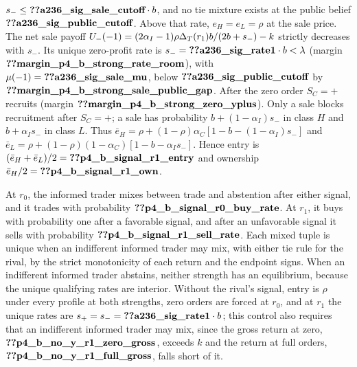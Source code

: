 \begin{itemize}[leftmargin=2em]
\(s_-\le\reg{a236_sig_sale_cutoff}\cdot b\), and no tie mixture exists at the public belief \(\reg{a236_sig_public_cutoff}\).
Above that rate, \(e_H=e_L=\rho\) at the sale price.
The net sale payoff \(U_-(-1)=(2\alpha_I-1)\rho\Delta_T(r_1)b/(2b+s_-)-k\) strictly decreases with \(s_-\).
Its unique zero-profit rate is \(s_-=\reg{a236_sig_rate1}\cdot b<\lambda\) (margin
\(\reg{margin_p4_b_strong_rate_room}\)), with \(\mu(-1)=\reg{a236_sig_sale_mu}\), below \(\reg{a236_sig_public_cutoff}\) by \(\reg{margin_p4_b_strong_sale_public_gap}\).
After the zero order \(S_C=+\) recruits (margin \(\reg{margin_p4_b_strong_zero_yplus}\)). Only a sale blocks recruitment
after \(S_C=+\); a sale has probability \(b+(1-\alpha_I)s_-\) in class \(H\) and \(b+\alpha_I s_-\) in class \(L\). Thus \(\bar e_H=\rho+(1-\rho)\alpha_C[1-b-(1-\alpha_I)s_-]\) and
\(\bar e_L=\rho+(1-\rho)(1-\alpha_C)[1-b-\alpha_I s_-]\). Hence entry is
\((\bar e_H+\bar e_L)/2=\reg{p4_b_signal_r1_entry}\) and ownership \(\bar e_H/2=\reg{p4_b_signal_r1_own}\).
\end{itemize}
At \(r_0\), the informed trader mixes between trade and abstention after either signal, and it trades with probability
\(\reg{p4_b_signal_r0_buy_rate}\). At \(r_1\), it buys with probability one after a favorable signal, and after an
unfavorable signal it sells with probability \(\reg{p4_b_signal_r1_sell_rate}\).
Each mixed tuple is unique when an indifferent informed trader may mix, with either tie rule for the rival, by the strict monotonicity of each return and
the endpoint signs. When an indifferent informed trader abstains, neither strength has an equilibrium, because the unique qualifying rates are
interior. Without the rival's signal, entry is \(\rho\) under every profile at both strengths, zero orders are
forced at \(r_0\), and at \(r_1\) the unique rates are \(s_+=s_-=\reg{a236_sig_rate1}\cdot b\); this control also requires that an indifferent informed trader may mix, since the gross
return at zero, \(\reg{p4_b_no_y_r1_zero_gross}\), exceeds \(k\) and the return at full orders,
\(\reg{p4_b_no_y_r1_full_gross}\), falls short of it.
